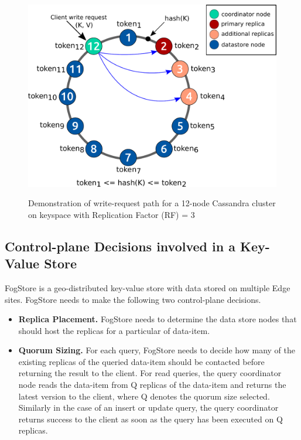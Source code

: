 \begin{figure}
\centering
\includegraphics[width=0.7\linewidth]{figures/fogstore/basics/hashring.pdf}
\label{fig:hashring_replication}
\caption{Demonstration of write-request path for a 12-node
Cassandra cluster on keyspace with Replication Factor (RF)
= 3}
\end{figure}

\subsection{Control-plane Decisions involved in a Key-Value Store}
FogStore is a geo-distributed key-value store with data stored on multiple Edge sites. FogStore needs to make the following two control-plane decisions.
\begin{itemize}
\item \textbf{Replica Placement.} FogStore needs to determine the data store nodes that should host the replicas for a particular of data-item.
\item \textbf{Quorum Sizing. } For each query, FogStore needs to decide how many of the existing replicas of the queried data-item should be contacted before returning the result to the client. For read queries, the query coordinator node reads the data-item from Q replicas of the data-item and returns the latest version to the client, where Q denotes the quorum size selected. Similarly in the case of an insert or update query, the query coordinator returns success to the client as soon as the query has been executed on Q replicas.
\end{itemize}

